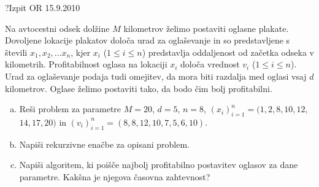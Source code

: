 \begin{naloga}{?}{Izpit OR 15.9.2010}
\begin{vprasanje}
Na avtocestni odsek dolžine $M$ kilometrov
želimo postaviti oglasne plakate.
Dovoljene lokacije plakatov določa urad za oglaševanje
in so predstavljene s števili $x_1, x_2, \dots x_n$,
kjer $x_i$ ($1 \le i \le n$)
predstavlja oddaljenost od začetka odseka v kilometrih.
Profitabilnost oglasa na lokaciji $x_i$ določa vrednost $v_i$
($1 \le i \le n$).
Urad za oglaševanje podaja tudi omejitev,
da mora biti razdalja med oglasi vsaj $d$ kilometrov.
Oglase želimo postaviti tako, da bodo čim bolj profitabilni.
\begin{enumerate}[(a)]
\item Reši problem za parametre $M = 20$, $d = 5$, $n = 8$,
$(x_i)_{i=1}^n = (1, 2, 8, 10, 12,$ $14, 17, 20)$ in
$(v_i)_{i=1}^n = (8, 8, 12, 10, 7, 5, 6, 10)$.
\item Napiši rekurzivne enačbe za opisani problem.
\item Napiši algoritem,
ki poišče najbolj profitabilno postavitev oglasov za dane parametre.
Kakšna je njegova časovna zahtevnost?
\end{enumerate}

\end{vprasanje}
\begin{odgovor}
\end{odgovor}
\end{naloga}
